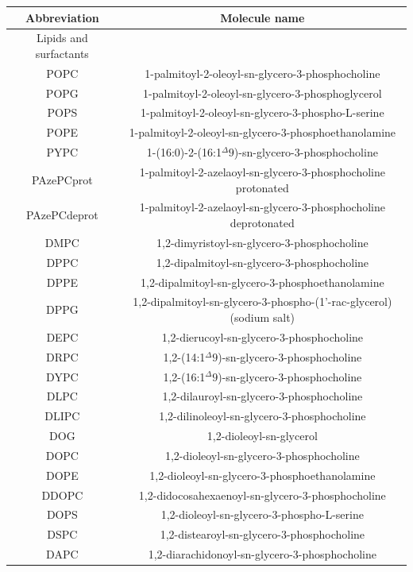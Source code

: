 \documentclass[fleqn,10pt]{wlscirepSI}
\begin{document}
\begin{table}[p]
    \centering
    \begin{tabular}{c c}
    Abbreviation & Molecule name \\
    \hline
    Lipids and surfactants & \\
    \hline
    POPC &  1-palmitoyl-2-oleoyl-sn-glycero-3-phosphocholine  \\
    POPG &  1-palmitoyl-2-oleoyl-sn-glycero-3-phosphoglycerol \\
    POPS & 1-palmitoyl-2-oleoyl-sn-glycero-3-phospho-L-serine \\
    POPE & 1-palmitoyl-2-oleoyl-sn-glycero-3-phosphoethanolamine \\
    PYPC & 1-(16:0)-2-(16:1$^\Delta9$)-sn-glycero-3-phosphocholine \\
    PAzePCprot & 1-palmitoyl-2-azelaoyl-sn-glycero-3-phosphocholine protonated \\
    PAzePCdeprot & 1-palmitoyl-2-azelaoyl-sn-glycero-3-phosphocholine deprotonated \\
    DMPC & 1,2-dimyristoyl-sn-glycero-3-phosphocholine \\
    DPPC & 1,2-dipalmitoyl-sn-glycero-3-phosphocholine \\
    DPPE & 1,2-dipalmitoyl-sn-glycero-3-phosphoethanolamine \\
    DPPG & 1,2-dipalmitoyl-sn-glycero-3-phospho-(1'-rac-glycerol) (sodium salt) \\
    DEPC & 1,2-dierucoyl-sn-glycero-3-phosphocholine \\
    DRPC & 1,2-(14:1$^\Delta9$)-sn-glycero-3-phosphocholine \\
    DYPC & 1,2-(16:1$^\Delta9$)-sn-glycero-3-phosphocholine \\
    DLPC & 1,2-dilauroyl-sn-glycero-3-phosphocholine \\
    DLIPC& 1,2-dilinoleoyl-sn-glycero-3-phosphocholine \\
    DOG  & 1,2-dioleoyl-sn-glycerol \\
    DOPC & 1,2-dioleoyl-sn-glycero-3-phosphocholine \\
    DOPE & 1,2-dioleoyl-sn-glycero-3-phosphoethanolamine \\
    DDOPC& 1,2-didocosahexaenoyl-sn-glycero-3-phosphocholine \\
    DOPS & 1,2-dioleoyl-sn-glycero-3-phospho-L-serine \\
    DSPC & 1,2-distearoyl-sn-glycero-3-phosphocholine \\
    DAPC & 1,2-diarachidonoyl-sn-glycero-3-phosphocholine \\

\end{tabular}
\end{table}
\end{document}
